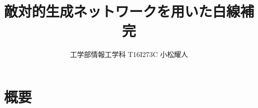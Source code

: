 \documentclass{jarticle}
\title{敵対的生成ネットワークを用いた白線補完}
\author{工学部情報工学科 T16I273C 小松耀人}
\begin{document}
\section{概要}
\end{document}
